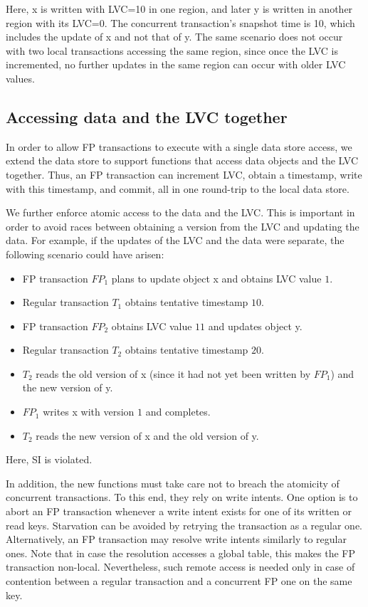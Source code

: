 Here, x is written with LVC=10 in one region, and later y is written in another region with its LVC=0. The
concurrent transaction's snapshot time is 10, which includes the update of x and
not that of y. The same scenario does not occur with two local transactions
accessing the same region, since once the LVC is incremented, no further
updates in the same region can occur with older LVC values.



\subsection{Accessing data and the LVC together} \label{ssec:lvc-access}

In order to allow FP transactions to execute with a single data store access,
we extend the data store to support functions that access data objects and the
LVC together. Thus, an FP transaction can increment LVC, obtain a timestamp, 
write with this timestamp, and commit, all in one round-trip to the local data store.

We further enforce atomic access to the data and the LVC. This is important in
order to avoid races between obtaining a version from the LVC and updating the
data. For example, if the updates of the LVC and the data were separate, the
following scenario could have arisen:
\begin{itemize}
  \item FP transaction $FP_1$ plans to update object x and obtains LVC value $1$.
  \item Regular transaction $T_1$ obtains tentative timestamp $10$.
  \item FP transaction $FP_2$ obtains LVC value $11$ and updates object y.
  \item Regular transaction $T_2$ obtains tentative timestamp $20$.
  \item $T_2$ reads the old version of x  (since it had not yet been written by $FP_1$)
  and the new version of  y.
  \item $FP_1$ writes x with version $1$ and completes.
  \item $T_2$ reads the new version of x and the old version of  y.
\end{itemize}
Here, SI is violated.

In addition, the new functions must take care not to breach the  atomicity of concurrent transactions. 
To this end, they rely on  write intents. 
One option is to abort an FP transaction whenever a write intent exists for one of its written or read keys. 
Starvation can be avoided by retrying the transaction as a regular one.
Alternatively, an FP transaction may resolve write intents similarly to regular ones.
Note that in case the resolution accesses a global table, this makes the FP transaction non-local.
Nevertheless, such remote access is needed only in case of contention between a regular transaction 
and a concurrent FP one on the same key.

